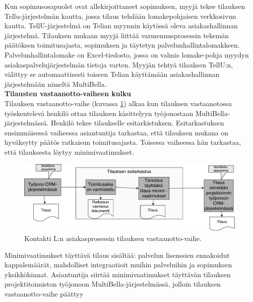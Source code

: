 \documentclass[finnish,12pt,a4paper,pdftex]{article}
\begin{document}
Kun sopimusosapuolet ovat allekirjoittaneet sopimuksen, myyjä tekee tilauksen Tellu-järjestelmän kautta, jossa tilaus tehdään lomakepohjaisen verkkosivun kautta. TellU-järjestelmä on Telian myynnin käytössä oleva asiakashallinnan järjestelmä. Tilauksen mukaan myyjä liittää varmennusprosessin tekemän päätöksen toimitusajasta, sopimuksen ja täytetyn palvelunhallintalomakkeen. Palvelunhallintalomake on Excel-tiedosto, jossa on valmis lomake-pohja myydyn asiakaspalvelujärjestelmän tietoja varten. Myyjän tehtyä tilauksen TellU:n, välittyy se automaattisesti toiseen Telian käyttämään asiakashallinnan järjestelmään nimeltä MultiBella.\\

\textbf{Tilausten vastaanotto-vaiheen kulku}\\


Tilauksen vastaanotto-vaihe (kuvassa \ref{fig:tilausvast}) alkaa kun tilauksen vastaanotossa työskentelevä henkilö ottaa tilauksen käsittelyyn työjonostaan MultiBella-järjestelmässä. Henkilö tekee tilaukselle esitarkistuksen. Esitarkastuksen ensimmäisessä vaiheessa asiantuntija tarkastaa, että tilauksen mukana on hyväksytty päätös ratkaisun toimitusajasta. Toisessa vaiheessa hän tarkastaa, että tilauksesta löytyy minimivaatimukset.\\

\begin{figure}[!h]
    \centering
    \includegraphics[scale=0.4]{images/tilvast.pdf}
    \caption{Kontakti L:n asiakasprosessin tilauksen vastaanotto-vaihe.}
    \label{fig:tilausvast}
\end{figure}

Minimivaatimukset täyttävä tilaus sisältää: palvelun lisenssien ennakoidut kappalemäärät, mahdolliset integraatioit muihin palveluihin ja sopimuksen yksikköhinnat. Asiantuntija siirtää minimivaatimukset täyttävän tilauksen projektitoimiston työjonoon MultiBella-järjestelmässä, jolloin tilauksen vastaanotto-vaihe päättyy\\
\end{document}

